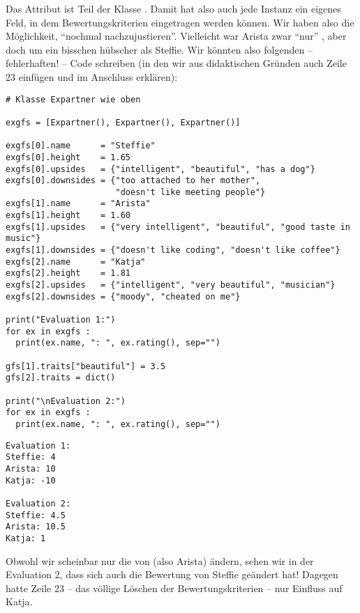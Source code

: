 Das Attribut  ist Teil der Klasse . Damit hat also auch jede Instanz ein eigenes Feld, in dem Bewertungskriterien eingetragen werden können. Wir haben also die Möglichkeit, \enquote{nochmal nachzujustieren}. Vielleicht war Arista zwar \enquote{nur} , aber doch um ein bisschen hübscher als Steffie. Wir könnten also folgenden -- fehlerhaften! -- Code schreiben (in den wir aus didaktischen Gründen auch Zeile 23 einfügen und im Anschluss erklären):
\begin{warnbox}[Beispiel: Versehentliches Ändern von Referenzen, leftupper=7mm]
\begin{verbatim}
# Klasse Expartner wie oben

exgfs = [Expartner(), Expartner(), Expartner()]

exgfs[0].name      = "Steffie"
exgfs[0].height    = 1.65
exgfs[0].upsides   = {"intelligent", "beautiful", "has a dog"}
exgfs[0].downsides = {"too attached to her mother",
                      "doesn't like meeting people"}
exgfs[1].name      = "Arista"
exgfs[1].height    = 1.60
exgfs[1].upsides   = {"very intelligent", "beautiful", "good taste in music"}
exgfs[1].downsides = {"doesn't like coding", "doesn't like coffee"}
exgfs[2].name      = "Katja"
exgfs[2].height    = 1.81
exgfs[2].upsides   = {"intelligent", "very beautiful", "musician"}
exgfs[2].downsides = {"moody", "cheated on me"}

print("Evaluation 1:")
for ex in exgfs :
  print(ex.name, ": ", ex.rating(), sep="")

gfs[1].traits["beautiful"] = 3.5
gfs[2].traits = dict()

print("\nEvaluation 2:")
for ex in exgfs :
  print(ex.name, ": ", ex.rating(), sep="")
\end{verbatim}
\end{warnbox}

\begin{cmdbox}
\begin{verbatim}
Evaluation 1:
Steffie: 4
Arista: 10
Katja: -10

Evaluation 2:
Steffie: 4.5
Arista: 10.5
Katja: 1
\end{verbatim}
\end{cmdbox}

Obwohl wir scheinbar nur die  von  (also Arista) ändern, sehen wir in der Evaluation 2, dass sich auch die Bewertung von Steffie geändert hat! Dagegen hatte Zeile 23 -- das völlige Löschen der Bewertungskriterien -- nur Einfluss auf Katja.

